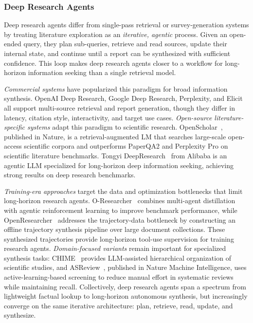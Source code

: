\subsubsection{Deep Research Agents}
\label{sec:deep_research}

Deep research agents differ from single-pass retrieval or survey-generation systems by treating literature exploration as an \emph{iterative, agentic} process. Given an open-ended query, they plan sub-queries, retrieve and read sources, update their internal state, and continue until a report can be synthesized with sufficient confidence. This loop makes deep research agents closer to a workflow for long-horizon information seeking than a single retrieval model.

\emph{Commercial systems} have popularized this paradigm for broad information synthesis. OpenAI Deep Research, Google Deep Research, Perplexity, and Elicit all support multi-source retrieval and report generation, though they differ in latency, citation style, interactivity, and target use cases. \emph{Open-source literature-specific systems} adapt this paradigm to scientific research. OpenScholar~\cite{openscholar2025}, published in Nature, is a retrieval-augmented LM that searches large-scale open-access scientific corpora and outperforms PaperQA2 and Perplexity Pro on scientific literature benchmarks. Tongyi DeepResearch~\cite{tongyi2025deepresearch} from Alibaba is an agentic LLM specialized for long-horizon deep information seeking, achieving strong results on deep research benchmarks.

\emph{Training-era approaches} target the data and optimization bottlenecks that limit long-horizon research agents. O-Researcher~\cite{oresearcher2026} combines multi-agent distillation with agentic reinforcement learning to improve benchmark performance, while OpenResearcher~\cite{li2026openresearcher} addresses the trajectory-data bottleneck by constructing an offline trajectory synthesis pipeline over large document collections. These synthesized trajectories provide long-horizon tool-use supervision for training research agents. \emph{Domain-focused variants} remain important for specialized synthesis tasks: CHIME~\cite{kang2024chime} provides LLM-assisted hierarchical organization of scientific studies, and ASReview~\cite{asreview2020}, published in Nature Machine Intelligence, uses active-learning-based screening to reduce manual effort in systematic reviews while maintaining recall. Collectively, deep research agents span a spectrum from lightweight factual lookup to long-horizon autonomous synthesis, but increasingly converge on the same iterative architecture: plan, retrieve, read, update, and synthesize.



